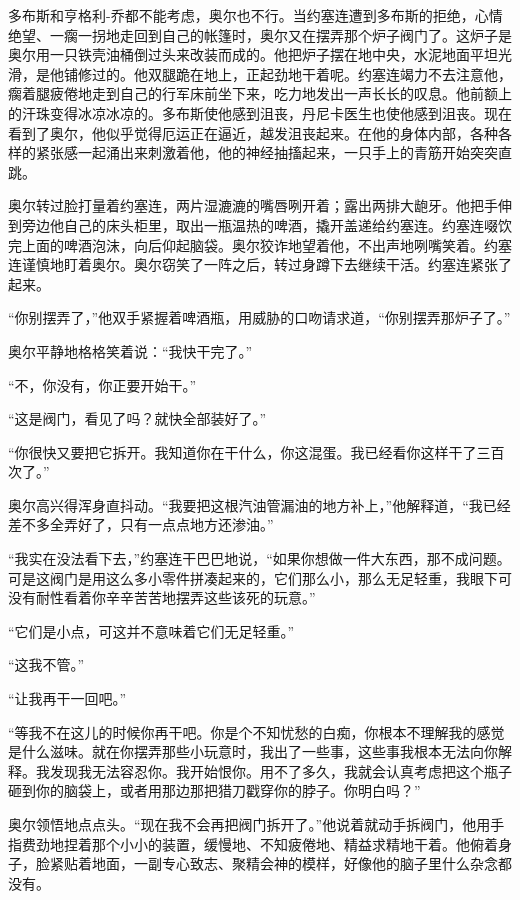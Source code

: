     多布斯和亨格利-乔都不能考虑，奥尔也不行。当约塞连遭到多布斯的拒绝，心情绝望、一瘸一拐地走回到自己的帐篷时，奥尔又在摆弄那个炉子阀门了。这炉子是奥尔用一只铁壳油桶倒过头来改装而成的。他把炉子摆在地中央，水泥地面平坦光滑，是他铺修过的。他双腿跪在地上，正起劲地干着呢。约塞连竭力不去注意他，瘸着腿疲倦地走到自己的行军床前坐下来，吃力地发出一声长长的叹息。他前额上的汗珠变得冰凉冰凉的。多布斯使他感到沮丧，丹尼卡医生也使他感到沮丧。现在看到了奥尔，他似乎觉得厄运正在逼近，越发沮丧起来。在他的身体内部，各种各样的紧张感一起涌出来刺激着他，他的神经抽搐起来，一只手上的青筋开始突突直跳。

    奥尔转过脸打量着约塞连，两片湿漉漉的嘴唇咧开着；露出两排大龅牙。他把手伸到旁边他自己的床头柜里，取出一瓶温热的啤酒，撬开盖递给约塞连。约塞连啜饮完上面的啤酒泡沫，向后仰起脑袋。奥尔狡诈地望着他，不出声地咧嘴笑着。约塞连谨慎地盯着奥尔。奥尔窃笑了一阵之后，转过身蹲下去继续干活。约塞连紧张了起来。

    “你别摆弄了，”他双手紧握着啤酒瓶，用威胁的口吻请求道，“你别摆弄那炉子了。”

    奥尔平静地格格笑着说：“我快干完了。”

    “不，你没有，你正要开始干。”

    “这是阀门，看见了吗？就快全部装好了。”

    “你很快又要把它拆开。我知道你在干什么，你这混蛋。我已经看你这样干了三百次了。”

    奥尔高兴得浑身直抖动。“我要把这根汽油管漏油的地方补上，”他解释道，“我已经差不多全弄好了，只有一点点地方还渗油。”

    “我实在没法看下去，”约塞连干巴巴地说，“如果你想做一件大东西，那不成问题。可是这阀门是用这么多小零件拼凑起来的，它们那么小，那么无足轻重，我眼下可没有耐性看着你辛辛苦苦地摆弄这些该死的玩意。”

    “它们是小点，可这并不意味着它们无足轻重。”

    “这我不管。”

    “让我再干一回吧。”

    “等我不在这儿的时候你再干吧。你是个不知忧愁的白痴，你根本不理解我的感觉是什么滋味。就在你摆弄那些小玩意时，我出了一些事，这些事我根本无法向你解释。我发现我无法容忍你。我开始恨你。用不了多久，我就会认真考虑把这个瓶子砸到你的脑袋上，或者用那边那把猎刀戳穿你的脖子。你明白吗？”

    奥尔领悟地点点头。“现在我不会再把阀门拆开了。”他说着就动手拆阀门，他用手指费劲地捏着那个小小的装置，缓慢地、不知疲倦地、精益求精地干着。他俯着身子，脸紧贴着地面，一副专心致志、聚精会神的模样，好像他的脑子里什么杂念都没有。
 


